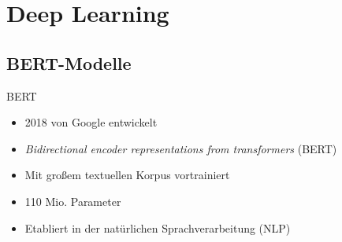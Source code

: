 \documentclass[aspectratio=169]{beamer} %
\begin{document}
\section{Deep Learning}


\subsection{BERT-Modelle}

\begin{frame}{BERT}
    \begin{itemize}
        \item 2018 von Google entwickelt
        \item \textit{Bidirectional encoder representations from transformers} (BERT)
        \item Mit großem textuellen Korpus vortrainiert
        \item 110 Mio. Parameter
        \item Etabliert in der natürlichen Sprachverarbeitung (NLP)
    \end{itemize}
\end{frame}
\end{document}
